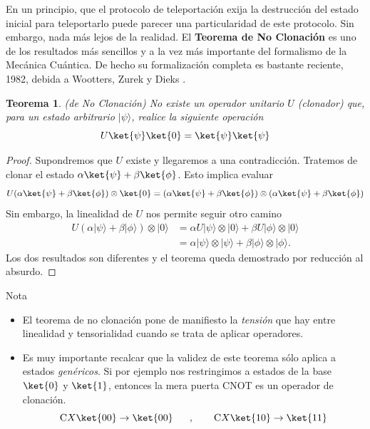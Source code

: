 \documentclass[a4paper,11pt]{book} %
\newtheorem{teorema_contador}{Teorema}
\newcommand{\Teorema}[1]{
		\begin{mybox_gray2}{}
			\begin{teorema_contador}
				 #1 
			\end{teorema_contador} 
		\end{mybox_gray2}
	}
\numberwithin{equation}{chapter}
\newcommand{\cg}[1]{{\rm C}#1}
\begin{document}
	En un principio, que el protocolo de teleportación exija la destrucción del estado inicial para teleportarlo puede parecer una particularidad de este protocolo. Sin embargo, nada más lejos de la realidad.
	El \textbf{Teorema de No Clonación} es uno de los resultados más sencillos y a la vez más importante del formalismo de la Mecánica Cuántica. De hecho su formalización completa es bastante reciente, 1982, debida a Wootters, Zurek \cite{clone2} y Dieks \cite{clone1}.
	
	\Teorema{ (\textit{de No Clonación})
	No existe un operador unitario $U$ (clonador) que, para un estado arbitrario $|\psi\rangle$, realice la siguiente operación
		\begin{equation}
		U \ket{\psi}\ket{0} = \ket{\psi}\ket{\psi}
		\end{equation}
	}

	\begin{proof}
	Supondremos que $U$ existe y llegaremos a una contradicción. 
	Tratemos de clonar el estado $\alpha\ket{\psi}+\beta\ket{\phi}$. Esto implica evaluar
		\begin{equation*}
		U (\alpha\ket{\psi}+\beta\ket{\phi})\otimes \ket{0} = 	(\alpha\ket{\psi}+\beta\ket{\phi})\otimes (\alpha\ket{\psi}+\beta\ket{\phi})
		\end{equation*}	
	Sin embargo, la linealidad de $U$ nos permite seguir otro camino
		\begin{align*}
		U(\alpha|\psi\rangle+\beta|\phi\rangle) \otimes|0\rangle 
			& = \alpha U|\psi\rangle \otimes|0\rangle+\beta U|\phi\rangle \otimes|0\rangle  \\
			& = \alpha|\psi\rangle \otimes|\psi\rangle+\beta|\phi\rangle \otimes|\phi\rangle . 
		\end{align*}
	Los dos resultados son diferentes y el teorema queda demostrado por reducción al absurdo.
	\end{proof}


	\begin{mybox_blue}{Nota}
	\begin{itemize}
		\item El teorema de no clonación pone  de manifiesto la  \textit{tensión} que hay entre linealidad y tensorialidad cuando se trata de aplicar operadores.
		\item Es muy importante recalcar que la validez de este teorema sólo aplica a estados \textit{genéricos}. 
	Si por ejemplo nos restringimos a estados de la base $\ket{0}$ y $\ket{1}$, entonces la mera puerta CNOT es un operador de clonación.
    $$
	\cg{X}\ket{00}\to \ket{00}~~~~~,~~~~~~ \cg{X}\ket{10}\to \ket{11}
	$$
	\end{itemize}		 
	\end{mybox_blue}
\end{document}
